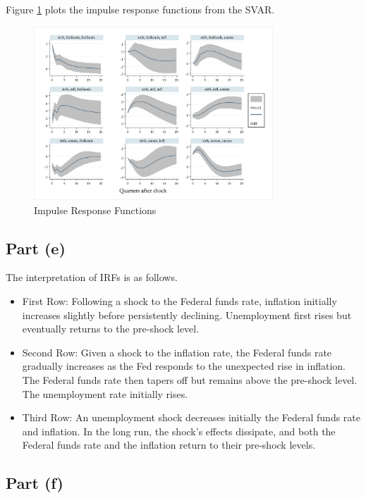 \documentclass[12pt]{article}
\begin{document}
Figure \ref{fig:svar_irf} plots the impulse response functions from the SVAR.

\begin{figure}[ht]
    \centering
    \includegraphics[width=0.8\textwidth]{figs/svar_irf.png}
    \caption{Impulse Response Functions}
    \label{fig:svar_irf}
\end{figure}

\subsection*{Part (e)} 

The interpretation of IRFs is as follows.

\begin{itemize}
    \item First Row: Following a shock to the Federal funds rate, inflation initially increases slightly before persistently declining. 
    Unemployment first rises but eventually returns to the pre-shock level.

    \item Second Row: Given a shock to the inflation rate, the Federal funds rate gradually increases as the Fed responds to the unexpected rise in inflation. 
    The Federal funds rate then tapers off but remains above the pre-shock level. 
    The unemployment rate initially rises. 

    \item Third Row: An unemployment shock decreases initially the Federal funds rate and inflation. 
    In the long run, the shock's effects dissipate, and both the Federal funds rate and the inflation return to their pre-shock levels.
\end{itemize}

\subsection*{Part (f)} 
\end{document}

